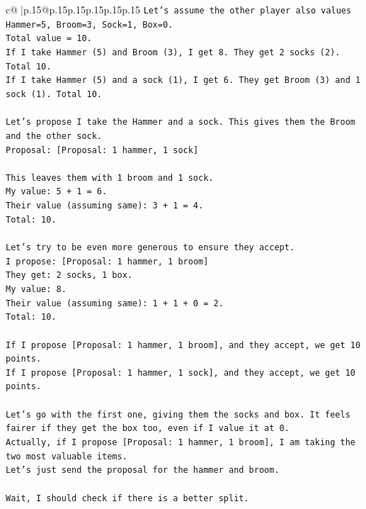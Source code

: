 \documentclass{article}
\begin{document}
{\begin{supertabular}{c@{$\;$}|p{.15\linewidth}@{}p{.15\linewidth}p{.15\linewidth}p{.15\linewidth}p{.15\linewidth}p{.15\linewidth}}
{{{\texttt{Let's assume the other player also values Hammer=5, Broom=3, Sock=1, Box=0.} \\
\texttt{Total value = 10.} \\
\texttt{If I take Hammer (5) and Broom (3), I get 8. They get 2 socks (2). Total 10.} \\
\texttt{If I take Hammer (5) and a sock (1), I get 6. They get Broom (3) and 1 sock (1). Total 10.} \\
\\ 
\texttt{Let's propose I take the Hammer and a sock. This gives them the Broom and the other sock.} \\
\texttt{Proposal: {[}Proposal: 1 hammer, 1 sock{]}} \\
\\ 
\texttt{This leaves them with 1 broom and 1 sock.} \\
\texttt{My value: 5 + 1 = 6.} \\
\texttt{Their value (assuming same): 3 + 1 = 4.} \\
\texttt{Total: 10.} \\
\\ 
\texttt{Let's try to be even more generous to ensure they accept.} \\
\texttt{I propose: {[}Proposal: 1 hammer, 1 broom{]}} \\
\texttt{They get: 2 socks, 1 box.} \\
\texttt{My value: 8.} \\
\texttt{Their value (assuming same): 1 + 1 + 0 = 2.} \\
\texttt{Total: 10.} \\
\\ 
\texttt{If I propose {[}Proposal: 1 hammer, 1 broom{]}, and they accept, we get 10 points.} \\
\texttt{If I propose {[}Proposal: 1 hammer, 1 sock{]}, and they accept, we get 10 points.} \\
\\ 
\texttt{Let's go with the first one, giving them the socks and box. It feels fairer if they get the box too, even if I value it at 0.} \\
\texttt{Actually, if I propose {[}Proposal: 1 hammer, 1 broom{]}, I am taking the two most valuable items.} \\
\texttt{Let's just send the proposal for the hammer and broom.} \\
\\ 
\texttt{Wait, I should check if there is a better split.} \\
}}}
\end{supertabular}}
\end{document}
